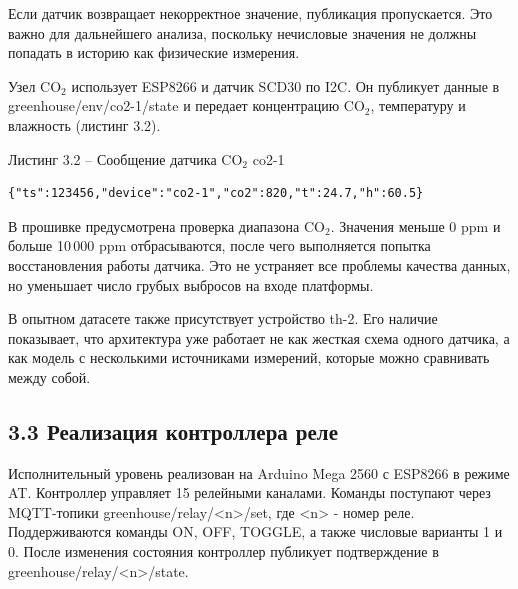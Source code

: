 \documentclass[a4paper,14pt]{extarticle}
\renewcommand{\texttt}[1]{\textnormal{#1}}
\begin{document}
Если датчик возвращает некорректное значение, публикация пропускается.
Это важно для дальнейшего анализа, поскольку нечисловые значения не
должны попадать в историю как физические измерения.

Узел CO\(_2\) использует ESP8266 и датчик SCD30 по I2C. Он публикует
данные в \texttt{greenhouse/env/co2-1/state} и передает концентрацию
CO\(_2\), температуру и влажность (листинг 3.2).

Листинг 3.2 -- Сообщение датчика CO\(_2\) co2-1

\par\noindent\begin{minipage}{\linewidth}
\begin{verbatim}
{"ts":123456,"device":"co2-1","co2":820,"t":24.7,"h":60.5}
\end{verbatim}
\end{minipage}\par

В прошивке предусмотрена проверка диапазона CO\(_2\). Значения меньше 0
ppm и больше 10\,000 ppm отбрасываются, после чего выполняется попытка
восстановления работы датчика. Это не устраняет все проблемы качества
данных, но уменьшает число грубых выбросов на входе платформы.

В опытном датасете также присутствует устройство \texttt{th-2}. Его
наличие показывает, что архитектура уже работает не как жесткая схема
одного датчика, а как модель с несколькими источниками измерений,
которые можно сравнивать между собой.

\hypertarget{ux440ux435ux430ux43bux438ux437ux430ux446ux438ux44f-ux43aux43eux43dux442ux440ux43eux43bux43bux435ux440ux430-ux440ux435ux43bux435}{%
\subsection{3.3 Реализация контроллера
реле}\label{ux440ux435ux430ux43bux438ux437ux430ux446ux438ux44f-ux43aux43eux43dux442ux440ux43eux43bux43bux435ux440ux430-ux440ux435ux43bux435}}

Исполнительный уровень реализован на Arduino Mega 2560 с ESP8266 в
режиме AT. Контроллер управляет 15 релейными каналами. Команды поступают
через MQTT-топики
\texttt{greenhouse/relay/\textless{}n\textgreater{}/set}, где
\texttt{\textless{}n\textgreater{}} - номер реле. Поддерживаются команды
\texttt{ON}, \texttt{OFF}, \texttt{TOGGLE}, а также числовые варианты
\texttt{1} и \texttt{0}. После изменения состояния контроллер публикует
подтверждение в
\texttt{greenhouse/relay/\textless{}n\textgreater{}/state}.
\end{document}
